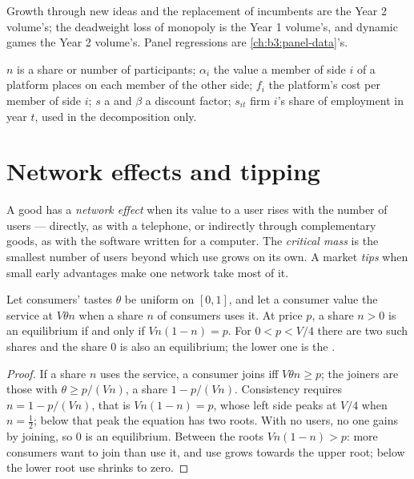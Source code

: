 \begin{recall}
Growth through new ideas and the replacement of incumbents are the Year 2 volume's;
the deadweight loss of monopoly is the Year 1 volume's, and dynamic games the Year 2
volume's. Panel regressions are \cref{ch:b3:panel-data}'s.
\end{recall}

\begin{notation}\label{not:b3:platforms-and-innovation:symbols}
$n$ is a share or number of participants; $\alpha_i$ the value a member of side $i$ of a platform
places on each member of the other side; $f_i$ the platform's cost per member of side $i$;
$s$ a  and $\beta$ a discount factor; $s_{it}$ firm $i$'s share of employment in year $t$, used in
the decomposition only.
\end{notation}

\section{Network effects and tipping}\label{sec:b3:platforms-and-innovation:network}

\begin{definition}\label{def:b3:platforms-and-innovation:network}
A good has a \emph{network effect} when its value to a user rises with the number of
users --- directly, as with a telephone, or indirectly through complementary
goods, as with the software written for a computer. The \emph{critical mass} is the
smallest number of users beyond which use grows on its own. A market \emph{tips} when
small early advantages make one network take most of it.
\end{definition}

\begin{proposition}\label{prop:b3:platforms-and-innovation:rohlfs}
Let consumers' tastes $\theta$ be uniform on $[0, 1]$, and let a consumer value the service at $V\theta n$ when a share $n$ of
consumers uses it. At price $p$, a share $n > 0$ is an equilibrium if and only if $Vn(1 - n) = p$. For $0 < p < V/4$ there are two
such shares and the share 0 is also an equilibrium; the lower one is the .
\end{proposition}

\begin{proof}
If a share $n$ uses the service, a consumer joins iff $V\theta n \ge p$; the joiners are those with $\theta \ge p/(Vn)$, a
share $1 - p/(Vn)$. Consistency requires $n = 1 - p/(Vn)$, that is $Vn(1 - n) = p$, whose left side peaks at $V/4$ when $n = \tfrac12$; below
that peak the equation has two roots. With no users, no one gains by joining, so 0 is
an equilibrium. Between the roots $Vn(1 - n) > p$: more consumers want to join than use it, and
use grows towards the upper root; below the lower root use shrinks to zero.
\end{proof}

